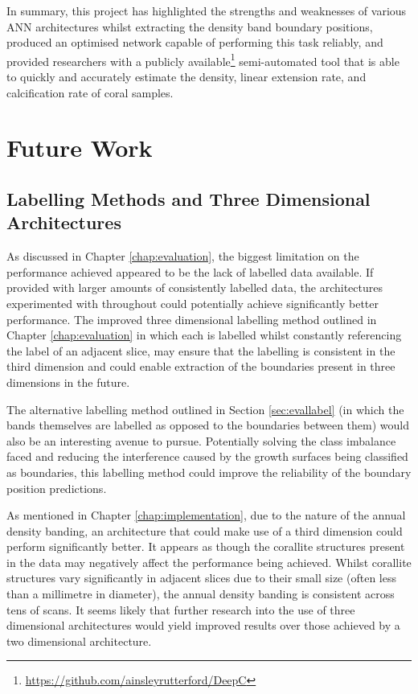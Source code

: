 In summary, this project has highlighted the strengths and weaknesses of various ANN architectures whilst extracting the density band boundary positions, produced an optimised network capable of performing this task reliably, and provided researchers with a publicly available\footnote{\url{https://github.com/ainsleyrutterford/DeepC}} semi-automated tool that is able to quickly and accurately estimate the density, linear extension rate, and calcification rate of coral samples.

\section{Future Work}

\subsection{Labelling Methods and Three Dimensional Architectures}

As discussed in Chapter \ref{chap:evaluation}, the biggest limitation on the performance achieved appeared to be the lack of labelled data available. If provided with larger amounts of consistently labelled data, the architectures experimented with throughout could potentially achieve significantly better performance. The improved three dimensional labelling method outlined in Chapter \ref{chap:evaluation} in which each is labelled whilst constantly referencing the label of an adjacent slice, may ensure that the labelling is consistent in the third dimension and could enable extraction of the boundaries present in three dimensions in the future.

The alternative labelling method outlined in Section \ref{sec:evallabel} (in which the bands themselves are labelled as opposed to the boundaries between them) would also be an interesting avenue to pursue. Potentially solving the class imbalance faced and reducing the interference caused by the growth surfaces being classified as boundaries, this labelling method could improve the reliability of the boundary position predictions.

As mentioned in Chapter \ref{chap:implementation}, due to the nature of the annual density banding, an architecture that could make use of a third dimension could perform significantly better. It appears as though the corallite structures present in the data may negatively affect the performance being achieved. Whilst corallite structures vary significantly in adjacent slices due to their small size (often less than a millimetre in diameter), the annual density banding is consistent across tens of scans. It seems likely that further research into the use of three dimensional architectures would yield improved results over those achieved by a two dimensional architecture.

